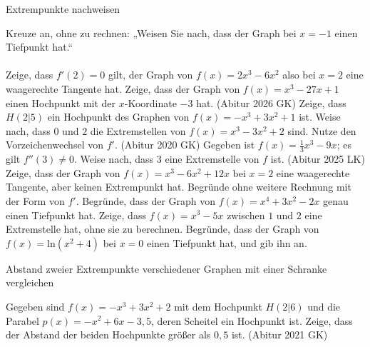 \begin{aufgabe}{Extrempunkte nachweisen}
\begin{teile}
\teil Kreuze an, ohne zu rechnen: „Weisen Sie nach, dass der Graph bei $x = -1$ einen Tiefpunkt hat.“ \\  \\ 
\teil Zeige, dass $f'(2) = 0$ gilt, der Graph von $f(x) = 2x^3 - 6x^2$ also bei $x = 2$ eine waagerechte Tangente hat.
\teil Zeige, dass der Graph von $f(x) = x^3 - 27x + 1$ einen Hochpunkt mit der $x$-Koordinate $-3$ hat. \hfill (Abitur 2026 GK)
\teil Zeige, dass $H(2 | 5)$ ein Hochpunkt des Graphen von $f(x) = -x^3 + 3x^2 + 1$ ist.
\teil Weise nach, dass $0$ und $2$ die Extremstellen von $f(x) = x^3 - 3x^2 + 2$ sind. Nutze den Vorzeichenwechsel von $f'$. \hfill (Abitur 2020 GK)
\teil Gegeben ist $f(x) = \frac{1}{3}x^3 - 9x$; es gilt $f''(3) \ne 0$. Weise nach, dass $3$ eine Extremstelle von $f$ ist. \hfill (Abitur 2025 LK)
\teil Zeige, dass der Graph von $f(x) = x^3 - 6x^2 + 12x$ bei $x = 2$ eine waagerechte Tangente, aber keinen Extrempunkt hat. Begründe ohne weitere Rechnung mit der Form von $f'$.
\teil Begründe, dass der Graph von $f(x) = x^4 + 3x^2 - 2x$ genau einen Tiefpunkt hat.
\teil Zeige, dass $f(x) = x^3 - 5x$ zwischen $1$ und $2$ eine Extremstelle hat, ohne sie zu berechnen.
\teil Begründe, dass der Graph von $f(x) = \mathrm{ln}(x^2 + 4)$ bei $x = 0$ einen Tiefpunkt hat, und gib ihn an.
\end{teile}
\end{aufgabe}

\begin{aufgabe}{Abstand zweier Extrempunkte verschiedener Graphen mit einer Schranke vergleichen}
\begin{teile}
\teil Gegeben sind $f(x) = -x^3 + 3x^2 + 2$ mit dem Hochpunkt $H(2 | 6)$ und die Parabel $p(x) = -x^2 + 6x - 3{,}5$, deren Scheitel ein Hochpunkt ist. Zeige, dass der Abstand der beiden Hochpunkte größer als $0{,}5$ ist. \hfill (Abitur 2021 GK)
\end{teile}
\end{aufgabe}

